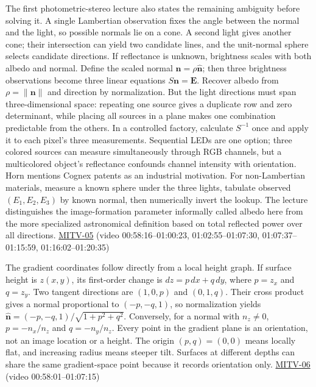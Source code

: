 The first photometric-stereo lecture also states the remaining ambiguity before solving it. A single Lambertian observation fixes the angle between the normal and the light, so possible normals lie on a cone. A second light gives another cone; their intersection can yield two candidate lines, and the unit-normal sphere selects candidate directions. If reflectance is unknown, brightness scales with both albedo and normal. Define the scaled normal \(\mathbf{n}=\rho\hat{\mathbf n}\); then three brightness observations become three linear equations \(S\mathbf n=\mathbf E\). Recover albedo from \(\rho=\|\mathbf n\|\) and direction by normalization. But the light directions must span three-dimensional space: repeating one source gives a duplicate row and zero determinant, while placing all sources in a plane makes one combination predictable from the others. In a controlled factory, calculate \(S^{-1}\) once and apply it to each pixel's three measurements. Sequential LEDs are one option; three colored sources can measure simultaneously through RGB channels, but a multicolored object's reflectance confounds channel intensity with orientation. Horn mentions Cognex patents as an industrial motivation. For non-Lambertian materials, measure a known sphere under the three lights, tabulate observed \((E_1,E_2,E_3)\) by known normal, then numerically invert the lookup. The lecture distinguishes the image-formation parameter informally called albedo here from the more specialized astronomical definition based on total reflected power over all directions. \hyperref[04-visual-computing-ii-ch036-mitv-05---tcc-and-for-montivision-demos-vanishing-point-use-of-vps-in-camera-calibration]{MITV-05} (video 00:58:16--01:00:23, 01:02:55--01:07:30, 01:07:37--01:15:59, 01:16:02--01:20:35)

The gradient coordinates follow directly from a local height graph. If surface height is \(z(x,y)\), its first-order change is \(dz=p\,dx+q\,dy\), where \(p=z_x\) and \(q=z_y\). Two tangent directions are \((1,0,p)\) and \((0,1,q)\). Their cross product gives a normal proportional to \((-p,-q,1)\), so normalization yields \(\hat{\mathbf n}=(-p,-q,1)/\sqrt{1+p^2+q^2}\). Conversely, for a normal with \(n_z\ne0\), \(p=-n_x/n_z\) and \(q=-n_y/n_z\). Every point in the gradient plane is an orientation, not an image location or a height. The origin \((p,q)=(0,0)\) means locally flat, and increasing radius means steeper tilt. Surfaces at different depths can share the same gradient-space point because it records orientation only. \hyperref[04-visual-computing-ii-ch036-mitv-06---photometric-stereo-noise-gain-error-amplification-eigenvalues-and-eigenvectors-review]{MITV-06} (video 00:58:01--01:07:15)

